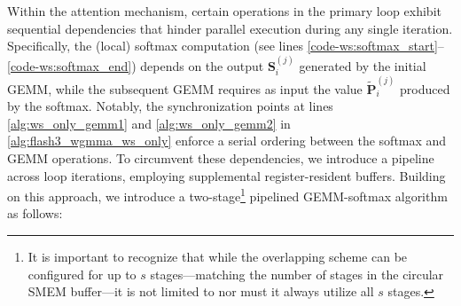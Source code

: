 \begin{enumerate}
Within the attention mechanism, certain operations in the primary loop exhibit sequential dependencies that hinder parallel execution during any single iteration. Specifically, the (local) softmax computation (see lines \ref{code-ws:softmax_start}–\ref{code-ws:softmax_end}) depends on the output $\mathbf{S}_i^{(j)}$ generated by the initial GEMM, while the subsequent GEMM requires as input the value $\widetilde{\mathbf{P}}_i^{(j)}$ produced by the softmax. Notably, the synchronization points at lines \ref{alg:ws_only_gemm1} and \ref{alg:ws_only_gemm2} in \cref{alg:flash3_wgmma_ws_only} enforce a serial ordering between the softmax and GEMM operations. To circumvent these dependencies, we introduce a pipeline across loop iterations, employing supplemental register-resident buffers. Building on this approach, we introduce a two-stage\footnote{It is important to recognize that while the overlapping scheme can be configured for up to $s$ stages—matching the number of stages in the circular SMEM buffer—it is not limited to nor must it always utilize all $s$ stages.} pipelined GEMM-softmax algorithm as follows:


\end{enumerate}
